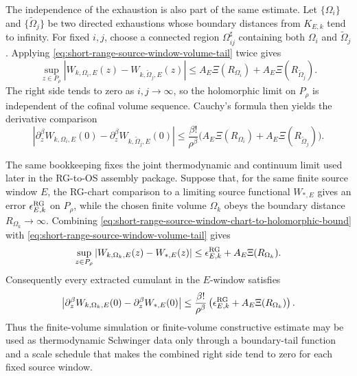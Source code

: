 The independence of the exhaustion is also part of the same estimate.  Let
\(\{\Omega_i\}\) and \(\{\widetilde\Omega_j\}\) be two directed exhaustions
whose boundary distances from \(K_{E,k}\) tend to infinity.  For fixed
\(i,j\), choose a connected region \(\Omega_{ij}^\sharp\) containing both
\(\Omega_i\) and \(\widetilde\Omega_j\).  Applying
\eqref{eq:short-range-source-window-volume-tail} twice gives
\begin{equation}
  \sup_{z\in P_\rho}
  |W_{k,\Omega_i,E}(z)-W_{k,\widetilde\Omega_j,E}(z)|
  \leq
  A_E\Xi(R_{\Omega_i})+
  A_E\Xi(R_{\widetilde\Omega_j}).
  \label{eq:short-range-source-window-cofinal-volume-bound}
\end{equation}
The right side tends to zero as \(i,j\to\infty\), so the holomorphic limit on
\(P_\rho\) is independent of the cofinal volume sequence.  Cauchy's formula
then yields the derivative comparison
\begin{equation}
  \left|
    \partial_z^\beta W_{k,\Omega_i,E}(0)
    -
    \partial_z^\beta W_{k,\widetilde\Omega_j,E}(0)
  \right|
  \leq
  \frac{\beta!}{\rho^\beta}
  \bigl(
    A_E\Xi(R_{\Omega_i})+
    A_E\Xi(R_{\widetilde\Omega_j})
  \bigr).
  \label{eq:short-range-source-window-cofinal-derivative-bound}
\end{equation}

The same bookkeeping fixes the joint thermodynamic and continuum limit used
later in the RG-to-OS assembly package.  Suppose that, for the same finite
source window \(E\), the RG-chart comparison to a limiting source functional
\(W_{\ast,E}\) gives an error \(\epsilon^{\rm RG}_{E,k}\) on \(P_\rho\),
while the chosen finite volume \(\Omega_k\) obeys the boundary distance
\(R_{\Omega_k}\to\infty\).  Combining
\eqref{eq:short-range-source-window-chart-to-holomorphic-bound} with
\eqref{eq:short-range-source-window-volume-tail} gives
\begin{equation}
  \sup_{z\in P_\rho}
  |W_{k,\Omega_k,E}(z)-W_{\ast,E}(z)|
  \leq
  \epsilon^{\rm RG}_{E,k}
  +
  A_E\Xi(R_{\Omega_k}).
  \label{eq:short-range-source-window-joint-volume-rg-bound}
\end{equation}
Consequently every extracted cumulant in the \(E\)-window satisfies
\begin{equation}
  \left|
    \partial_z^\beta W_{k,\Omega_k,E}(0)
    -
    \partial_z^\beta W_{\ast,E}(0)
  \right|
  \leq
  \frac{\beta!}{\rho^\beta}
  \left(
    \epsilon^{\rm RG}_{E,k}
    +
    A_E\Xi(R_{\Omega_k})
  \right).
  \label{eq:short-range-source-window-joint-volume-rg-derivative-bound}
\end{equation}
Thus the finite-volume simulation or finite-volume constructive estimate may
be used as thermodynamic Schwinger data only through a boundary-tail function
and a scale schedule that makes the combined right side tend to zero for
each fixed source window.

